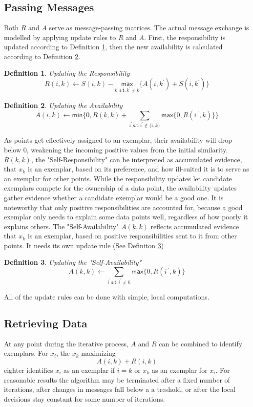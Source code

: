 \documentclass[11pt,a4paper]{article}
\newtheorem{definition}{Definition}
\begin{document}
\subsection{Passing Messages}
Both $R$ and $A$ serve as message-passing matrices. The actual message exchange is modelled by applying update rules to $R$ and $A$. First, the responsibility is updated according to Definition \ref{def:respupdate}, then the new availability is calculated according to Definition \ref{def:avupdate}.
\begin{definition}\label{def:respupdate}
	Updating the Responsibility
	\[
		R(i,k) \leftarrow S(i,k) - \underset{k^\prime\, \mathsf{s.t.}\, k^\prime \neq k}{\mathsf{max}} \{A(i,k^\prime) + S(i,k^\prime)\}
	\]
\end{definition}
\begin{definition}\label{def:avupdate}
	Updating the Availability
	\[
		A(i,k) \leftarrow \mathsf{min}\{0,R(k,k) + \sum\limits_{i^\prime\,\mathsf{s.t.}\, i^\prime \notin \{i,k\}}\mathsf{max}\{0, R(i^{\, \prime} ,k)\}\}
	\]
\end{definition}
As points get effectively assigned to an exemplar, their availability will drop below 0, weakening the incoming positive values from the initial similarity. $R(k,k)$, the "Self-Responsibility" can be interpreted as accumulated evidence, that $x_k$ is an exemplar, based on its preference, and how ill-suited it is to serve as an exemplar for other points. \cite{frey2007clustering} While the responsibility updates let candidate exemplars compete for the ownership of a data point, the availability updates gather evidence whether a candidate exemplar would be a good one. It is noteworthy that only positive responsibilities are accounted for, because a good exemplar only needs to explain some data points well, regardless of how poorly it explains others. \cite{frey2007clustering} The "Self-Availability" $A(k,k)$ reflects accumulated evidence that $x_k$ is an exemplar, based on positive responsibilities sent to it from other points. It needs its own update rule (See Definiton \ref{def:savupdate})
\begin{definition}\label{def:savupdate}
	Updating the "Self-Availability"
	\[
   		A(k,k) \leftarrow \sum\limits_{i^\prime\, \mathsf{s.t.}\, i^\prime \neq k} \mathsf{max} \{0, R(i^{\, \prime} ,k)\}
	\]
\end{definition}
All of the update rules can be done with simple, local computations. \cite{frey2007clustering}
\subsection{Retrieving Data}
At any point during the iterative process, $A$ and $R$ can be combined to identify exemplars. For $x_i$, the $x_k$ maximizing
\[
	A(i,k) + R(i,k)
\]
eighter identifies $x_i$ as an exemplar if $i=k$ or $x_k$ as an exemplar for $x_i$. \cite{frey2007clustering} For reasonable results the algorithm may be terminated after a fixed number of iterations, after changes in messages fall below a a treshold, or after the local decisions stay constant for some number of iterations. \cite{frey2007clustering}
\end{document}
